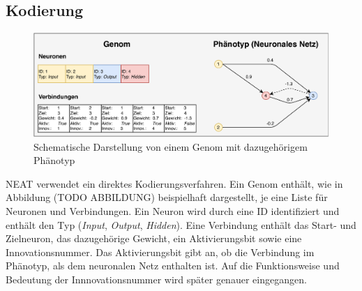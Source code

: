 \subsection{Kodierung}
\label{subsec:neat_encoding} %
\begin{figure}[!h]
	\centering
	\includegraphics[width=1\textwidth]{./img/neat_genome_encoding.pdf} 
	\caption{Schematische Darstellung von einem Genom mit dazugehörigem Phänotyp}
	\label{fig:neat_encoding}
\end{figure}
\ac{NEAT} verwendet ein direktes Kodierungsverfahren. Ein Genom enthält, wie in Abbildung (TODO ABBILDUNG) beispielhaft dargestellt, je eine Liste für Neuronen und Verbindungen. Ein Neuron wird durch eine ID identifiziert und enthält den Typ (\emph{Input}, \emph{Output}, \emph{Hidden}). Eine Verbindung enthält das Start- und Zielneuron, das dazugehörige Gewicht, ein Aktivierungsbit sowie eine Innovationsnummer. Das Aktivierungsbit gibt an, ob die Verbindung im Phänotyp, als dem neuronalen Netz enthalten ist. Auf die Funktionsweise und Bedeutung der Innnovationsnummer wird später genauer eingegangen.
